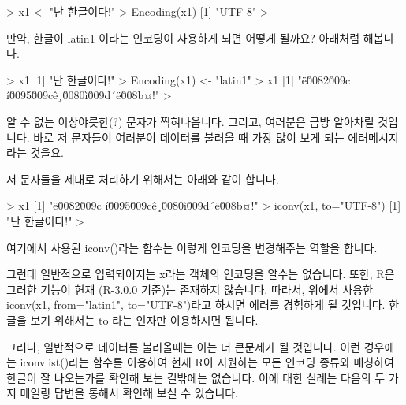 \documentclass[tutorial.tex]{subfiles}
\begin{document}
\begin{Schunk}
\begin{Soutput}
> x1 <- "난 한글이다!"
> Encoding(x1)
[1] "UTF-8"
> 
\end{Soutput}
\end{Schunk}

만약, 한글이 latin1 이라는 인코딩이 사용하게 되면 어떻게 될까요? 
아래처럼 해봅니다.

\begin{Schunk}
\begin{Soutput}
> x1
[1] "난 한글이다!"
> Encoding(x1) <- "latin1"
> x1
[1] "ë\u0082\u009c í\u0095\u009cê¸\u0080ì\u009d´ë\u008b¤!"
> 
\end{Soutput}
\end{Schunk}

알 수 없는 이상야릇한(?) 문자가 찍혀나옵니다. 
그리고, 여러분은 금방 알아차릴 것입니다.
바로 저 문자들이 여러분이 데이터를 불러올 때 가장 많이 보게 되는 에러메시지라는 것을요.

저 문자들을 제대로 처리하기 위해서는 아래와 같이 합니다. 
\begin{Schunk}
\begin{Soutput}
> x1
[1] "ë\u0082\u009c í\u0095\u009cê¸\u0080ì\u009d´ë\u008b¤!"
> iconv(x1, to="UTF-8")
[1] "난 한글이다!"
> 
\end{Soutput}
\end{Schunk}

여기에서 사용된 iconv()라는 함수는 이렇게 인코딩을 변경해주는 역할을 합니다. 

그런데 일반적으로 입력되어지는 x라는 객체의 인코딩을 알수는 없습니다.
또한, R은 그러한 기능이 현재 (R-3.0.0 기준)는 존재하지 않습니다.
따라서, 위에서 사용한 iconv(x1, from="latin1", to="UTF-8")라고 하시면 에러를 경험하게 될 것입니다.
한글을 보기 위해서는 to 라는 인자만 이용하시면 됩니다.

그러나, 일반적으로 데이터를 불러올때는 이는 더 큰문제가 될 것입니다.
이런 경우에는 iconvlist()라는 함수를 이용하여 현재 R이 지원하는 모든 인코딩 종류와 매칭하여 한글이 잘 나오는가를 확인해 보는 길밖에는 없습니다.
이에 대한 실례는 다음의 두 가지 메일링 답변을 통해서 확인해 보실 수 있습니다. 
\end{document}
